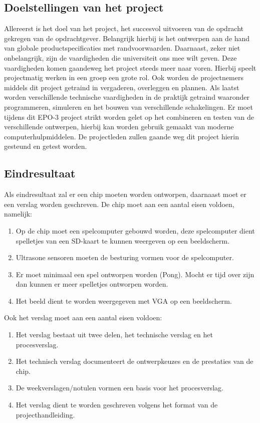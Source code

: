 \documentclass[oneside,dutch]{tudelft-report}
\begin{document}
\subsection{Doelstellingen van het project}
Allereerst is het doel van het project, het succesvol uitvoeren van de opdracht gekregen van de opdrachtgever. Belangrijk hierbij is het ontwerpen aan de hand van globale productspecificaties met randvoorwaarden. Daarnaast, zeker niet onbelangrijk, zijn de vaardigheden die universiteit ons mee wilt geven. Deze vaardigheden komen gaandeweg het project steeds meer naar voren.  Hierbij speelt projectmatig werken in een groep een grote rol. Ook worden de projectnemers middels dit project getraind in vergaderen, overleggen en plannen. Als laatst worden verschillende technische vaardigheden in de praktijk getraind waaronder programmeren, simuleren en het bouwen van verschillende schakelingen. Er moet tijdens dit EPO-3 project strikt worden gelet op het combineren en testen van de verschillende ontwerpen, hierbij kan worden gebruik gemaakt van moderne computerhulpmiddelen. De projectleden zullen gaande weg dit project hierin gesteund en getest worden.  

\subsection{Eindresultaat}
Als eindresultaat zal er een chip moeten worden ontworpen, daarnaast moet er een verslag worden geschreven.
De chip moet aan een aantal eisen voldoen, namelijk:
\begin{enumerate}
\item Op de chip moet een spelcomputer gebouwd worden, deze spelcomputer dient spelletjes van een SD-kaart te kunnen weergeven op een beeldscherm.
\item Ultrasone sensoren moeten de besturing vormen voor de spelcomputer.
\item Er moet minimaal een spel ontworpen worden (Pong). Mocht er tijd over zijn dan kunnen er meer spelletjes ontworpen worden.
\item Het beeld dient te worden weergegeven met VGA op een beeldscherm.
\end{enumerate}
Ook het verslag moet aan een aantal eisen voldoen:
\begin{enumerate}
\item Het verslag bestaat uit twee delen, het technische verslag en het procesverslag.
\item Het technisch verslag documenteert de ontwerpkeuzes en de prestaties van de chip.
\item De weekverslagen/notulen vormen een basis voor het procesverslag.
\item Het verslag dient te worden geschreven volgens het format van de projecthandleiding.
\end{enumerate}
\end{document}
